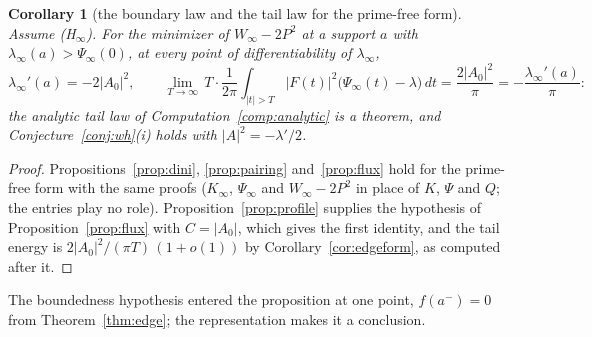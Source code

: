 \documentclass[11pt]{article}
\newtheorem{corollary}[theorem]{Corollary}
\theoremstyle{definition}
\theoremstyle{remark}
\begin{document}
\begin{corollary}[the boundary law and the tail law for the prime-free form]\label{cor:primefree}
Assume (H$_\infty$). For the minimizer of $W_\infty-2P^2$ at a support $a$ with $\lambda_\infty(a)>\Psi_\infty(0)$, at every point of differentiability of $\lambda_\infty$,
\[
\lambda_\infty'(a)=-2|A_0|^2,\qquad \lim_{T\to\infty}\,T\cdot\frac1{2\pi}\int_{|t|>T}|F(t)|^2\big(\Psi_\infty(t)-\lambda\big)\,dt=\frac{2|A_0|^2}\pi=-\frac{\lambda_\infty'(a)}\pi :
\]
the analytic tail law of Computation~\ref{comp:analytic} is a theorem, and Conjecture~\ref{conj:wh}(i) holds with $|A|^2=-\lambda'/2$.
\end{corollary}
\begin{proof}
Propositions~\ref{prop:dini}, \ref{prop:pairing} and~\ref{prop:flux} hold for the prime-free form with the same proofs ($K_\infty$, $\Psi_\infty$ and $W_\infty-2P^2$ in place of $K$, $\Psi$ and $Q$; the entries play no role). Proposition~\ref{prop:profile} supplies the hypothesis of Proposition~\ref{prop:flux} with $C=|A_0|$, which gives the first identity, and the tail energy is $2|A_0|^2/(\pi T)\,(1+o(1))$ by Corollary~\ref{cor:edgeform}, as computed after it.
\end{proof}

The boundedness hypothesis entered the proposition at one point, $f(a^-)=0$ from Theorem~\ref{thm:edge}; the representation makes it a conclusion.
\end{document}
